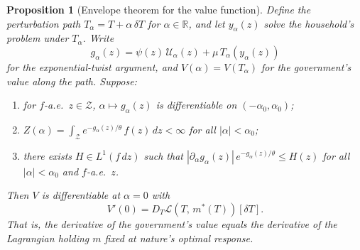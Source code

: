 \documentclass[12pt,a4paper]{article}
\theoremstyle{definition}
\theoremstyle{plain}
\newtheorem{proposition}{Proposition}[section]
\theoremstyle{remark}
\newcommand{\R}{\mathbb{R}}
\newcommand{\calU}{\mathcal{U}}
\newcommand{\calZ}{\mathcal{Z}}
\newcommand{\calL}{\mathcal{L}}
\begin{document}
\begin{proposition}[Envelope theorem for the value function]
\label{prop:envelope}
Define the perturbation path
$T_\alpha = T + \alpha\,\delta T$ for $\alpha \in \R$,
and let $y_\alpha(z)$ solve the household's problem under
$T_\alpha$.  Write
\begin{equation}
\label{eq:g_alpha_def}
  g_\alpha(z)
  = \psi(z)\,\calU_\alpha(z) + \mu\,T_\alpha(y_\alpha(z))
\end{equation}
for the exponential-twist argument, and
$V(\alpha) = V(T_\alpha)$ for the government's value
along the path.  Suppose:
\begin{enumerate}[label=(\roman*)]
\item for $f$-a.e.\ $z \in \calZ$,
  $\alpha \mapsto g_\alpha(z)$ is differentiable
  on $(-\alpha_0, \alpha_0)$;
\item $Z(\alpha) = \int_\calZ
  e^{-g_\alpha(z)/\theta}\,f(z)\,dz < \infty$
  for all $|\alpha| < \alpha_0$;
\item there exists $H \in L^1(f\,dz)$ such that
  $|\partial_\alpha g_\alpha(z)|\,
  e^{-g_\alpha(z)/\theta} \leq H(z)$
  for all $|\alpha| < \alpha_0$ and $f$-a.e.\ $z$.
\end{enumerate}
Then $V$ is differentiable at $\alpha = 0$ with
\begin{equation}
\label{eq:envelope_V}
  V'(0)
  = D_T\calL(T,\, m^*(T))[\delta T].
\end{equation}
That is, the derivative of the government's value equals
the derivative of the Lagrangian holding $m$ fixed at
nature's optimal response.
\end{proposition}
\end{document}
